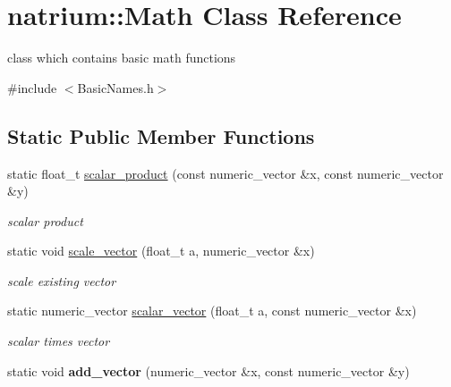 \hypertarget{classnatrium_1_1Math}{\section{natrium\-:\-:\-Math \-Class \-Reference}
\label{classnatrium_1_1Math}
}


class which contains basic math functions  




{\ttfamily \#include $<$\-Basic\-Names.\-h$>$}

\subsection*{\-Static \-Public \-Member \-Functions}
\begin{DoxyCompactItemize}
\item 
\hypertarget{classnatrium_1_1Math_acb9f9cb7ff053ff86da3cf730a78fc3f}{static float\-\_\-t \hyperlink{classnatrium_1_1Math_acb9f9cb7ff053ff86da3cf730a78fc3f}{scalar\-\_\-product} (const numeric\-\_\-vector \&x, const numeric\-\_\-vector \&y)}\label{classnatrium_1_1Math_acb9f9cb7ff053ff86da3cf730a78fc3f}

\begin{DoxyCompactList}\small\item\em scalar product \end{DoxyCompactList}\item 
\hypertarget{classnatrium_1_1Math_a3396e401ecdf6eaea63441e4ab87e67d}{static void \hyperlink{classnatrium_1_1Math_a3396e401ecdf6eaea63441e4ab87e67d}{scale\-\_\-vector} (float\-\_\-t a, numeric\-\_\-vector \&x)}\label{classnatrium_1_1Math_a3396e401ecdf6eaea63441e4ab87e67d}

\begin{DoxyCompactList}\small\item\em scale existing vector \end{DoxyCompactList}\item 
\hypertarget{classnatrium_1_1Math_a866bc6361557248b9b6e2d8aac6696f5}{static numeric\-\_\-vector \hyperlink{classnatrium_1_1Math_a866bc6361557248b9b6e2d8aac6696f5}{scalar\-\_\-vector} (float\-\_\-t a, const numeric\-\_\-vector \&x)}\label{classnatrium_1_1Math_a866bc6361557248b9b6e2d8aac6696f5}

\begin{DoxyCompactList}\small\item\em scalar times vector \end{DoxyCompactList}\item 
\hypertarget{classnatrium_1_1Math_abf43ba6f35909ea95ceadc2c8eb33aa6}{static void {\bfseries add\-\_\-vector} (numeric\-\_\-vector \&x, const numeric\-\_\-vector \&y)}\label{classnatrium_1_1Math_abf43ba6f35909ea95ceadc2c8eb33aa6}


\end{DoxyCompactItemize}
